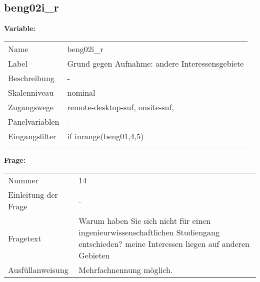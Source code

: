 	
	
	\subsection{beng02i\_r}
	\label{subSection:beng02i_r}

	\noindent\textbf{Variable:}\\
		\begin{tabular}{lL{11.3cm}}
			\label{tableVariable:beng02i_r}
			Name & beng02i\_r \\
			Label & Grund gegen Aufnahme:  andere Interessensgebiete  \\
			Beschreibung & - \\
			Skalenniveau & nominal \\
			Zugangswege &
				remote-desktop-suf,
				onsite-suf,
 \\
			Panelvariablen & -
			 \\
			Eingangsfilter & if inrange(beng01,4,5) \\
 \\
		\end{tabular}

		\vspace*{1 cm}
		\noindent\textbf{Frage:}\\
		\begin{tabular}{lL{11.3cm}}
			\label{tableQuestion:beng02i_r}
			Nummer & 14 \\
			Einleitung der Frage & - \\
			Fragetext & Warum haben Sie sich nicht für einen ingenieurwissenschaftlichen Studiengang entschieden?
meine Interessen liegen auf anderen Gebieten \\
			Ausfüllanweisung & Mehrfachnennung möglich. \\
		\end{tabular}





